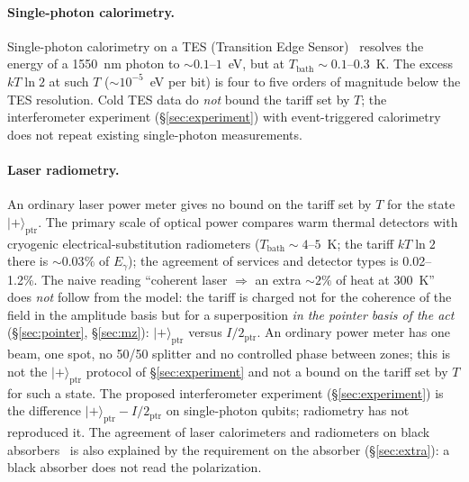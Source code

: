 \documentclass[11pt,a4paper]{article}
\newcommand{\Sref}[1]{\hyperref[#1]{\S\ref{#1}}}
\begin{document}
\paragraph{Single-photon calorimetry.}
Single-photon calorimetry on a TES (Transition Edge Sensor)~\cite{karimi2020} resolves the energy of a 1550~nm photon to $\sim 0.1$--$1$~eV, but at $T_{\mathrm{bath}}\sim 0.1$--$0.3$~K. The excess $kT\ln 2$ at such $T$ ($\sim 10^{-5}$~eV per bit) is four to five orders of magnitude below the TES resolution. Cold TES data do \emph{not} bound the tariff set by $T$; the interferometer experiment (\Sref{sec:experiment}) with event-triggered calorimetry does not repeat existing single-photon measurements.

\paragraph{Laser radiometry.}
An ordinary laser power meter gives no bound on the tariff set by $T$ for the state $|{+}\rangle_{\mathrm{ptr}}$. The primary scale of optical power compares warm thermal detectors with cryogenic electrical-substitution radiometers ($T_{\mathrm{bath}}\sim 4$--$5$~K; the tariff $kT\ln 2$ there is $\sim 0.03\%$ of $E_{\gamma}$); the agreement of services and detector types is 0.02--1.2\%. The naive reading ``coherent laser $\Rightarrow$ an extra $\sim 2\%$ of heat at 300~K'' does \emph{not} follow from the model: the tariff is charged not for the coherence of the field in the amplitude basis but for a superposition \emph{in the pointer basis of the act} (\Sref{sec:pointer}, \Sref{sec:mz}): $|{+}\rangle_{\mathrm{ptr}}$ versus $I/2_{\mathrm{ptr}}$. An ordinary power meter has one beam, one spot, no 50/50 splitter and no controlled phase between zones; this is not the $|{+}\rangle_{\mathrm{ptr}}$ protocol of \Sref{sec:experiment} and not a bound on the tariff set by $T$ for such a state. The proposed interferometer experiment (\Sref{sec:experiment}) is the difference $|{+}\rangle_{\mathrm{ptr}} - I/2_{\mathrm{ptr}}$ on single-photon qubits; radiometry has not reproduced it. The agreement of laser calorimeters and radiometers on black absorbers~\cite{lehman2004,spidell2021} is also explained by the requirement on the absorber (\Sref{sec:extra}): a black absorber does not read the polarization.
\end{document}
